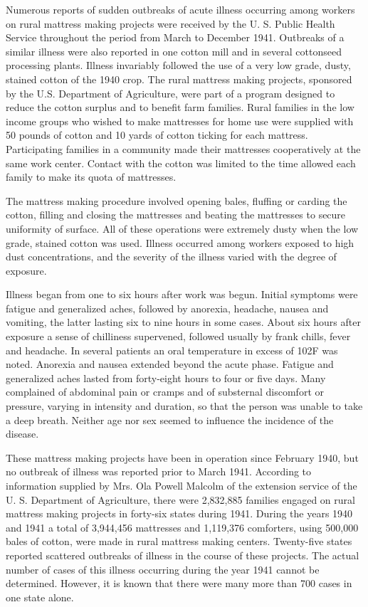 \documentclass[10pt, letterpaper]{memoir}
\begin{document}
\begin{multicols}{2}
Numerous reports of sudden outbreaks of acute illness occurring among workers on rural mattress making projects were received by the U. S. Public Health Service throughout the period from March to December 1941. Outbreaks of a similar illness were also reported in one cotton mill and in several cottonseed processing plants. Illness invariably followed the use of a very low grade, dusty, stained cotton of the 1940 crop. The rural mattress making projects, sponsored by the U.S. Department of Agriculture, were part of a program designed to reduce the cotton surplus and to benefit farm families. Rural families in the low income groups who wished to make mattresses for home use were supplied with 50 pounds of cotton and 10 yards of cotton ticking for each mattress. Participating families in a community made their mattresses cooperatively at the same work center. Contact with the cotton was limited to the time allowed each family to make its quota of mattresses.

The mattress making procedure involved opening bales, fluffing or carding the cotton, filling and closing the mattresses and beating the mattresses to secure uniformity of surface. All of these operations were extremely dusty when the low grade, stained cotton was used. Illness occurred among workers exposed to high dust concentrations, and the severity of the illness varied with the degree of exposure.

Illness began from one to six hours after work was begun. Initial symptoms were fatigue and generalized aches, followed by anorexia, headache, nausea and vomiting, the latter lasting six to nine hours in some cases. About six hours after exposure a sense of chilliness supervened, followed usually by frank chills, fever and headache. In several patients an oral temperature in excess of 102\textdegree{}F was noted. Anorexia and nausea extended beyond the acute phase. Fatigue and generalized aches lasted from forty-eight hours to four or five days. Many complained of abdominal pain or cramps and of substernal discomfort or pressure, varying in intensity and duration, so that the person was unable to take a deep breath. Neither age nor sex seemed to influence the incidence of the disease.

These mattress making projects have been in operation since February 1940, but no outbreak of illness was reported prior to March 1941. According to information supplied by Mrs. Ola Powell Malcolm of the extension service of the U. S. Department of Agriculture, there were 2,832,885 families engaged on rural mattress making projects in forty-six states during 1941. During the years 1940 and 1941 a total of 3,944,456 mattresses and 1,119,376 comforters, using 500,000 bales of cotton, were made in rural mattress making centers. Twenty-five states reported scattered outbreaks of illness in the course of these projects. The actual number of cases of this illness occurring during the year 1941 cannot be determined. However, it is known that there were many more than 700 cases in one state alone.


\end{multicols}
\end{document}
